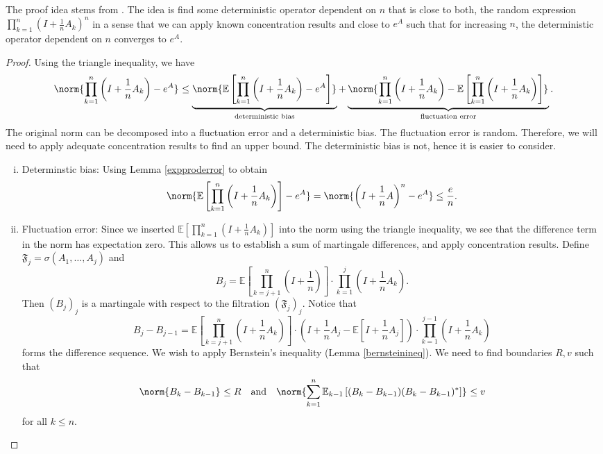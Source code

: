 The proof idea stems from \cite{chen2021product}. The idea is find some deterministic operator dependent on \( n \) that is close to both, the random expression \( \prod_{k=1}^{n}\left(I+\frac{1}{n}A_k\right)^{n} \) in a sense that we can apply known concentration results and close to \( e^{A} \) such that for increasing \( n \), the deterministic operator dependent on \( n \) converges to \( e^{A} \).
\begin{proof}
    Using the triangle inequality, we have 
    \[ \norm{\prod_{k=1}^{n}\left(I+\frac{1}{n}A_k\right)-e^{A}}_{} \leq \underbrace{\norm{\mathbb{E}\left[\prod_{k=1}^{n}\left(I+\frac{1}{n}A_k\right)- e^{A}\right]}_{}}_{\text{deterministic bias}} + \underbrace{\norm{\prod_{k=1}^{n} \left(I+\frac{1}{n}A_k\right)- \mathbb{E}\left[\prod_{k=1}^{n}\left(I+ \frac{1}{n}A_k\right)\right]}_{}}_{\text{fluctuation error}}. \]
    The original norm can be decomposed into a fluctuation error and a deterministic bias. The fluctuation error is random. Therefore, we will need to apply adequate concentration results to find an upper bound. The deterministic bias is not, hence it is easier to consider.
    \begin{enumerate}[(i)]
      \item Determinstic bias:
        Using Lemma \ref{expproderror} to obtain
        \[ \norm{\mathbb{E}\left[\prod_{k=1}^{n}\left(I+\frac{1}{n}A_k\right)\right]-e^{A}} = \norm{\left(I+\frac{1}{n}A\right)^{n} - e^{A}}\leq  \frac{e}{n} .\]
      \item Fluctuation error:
        Since we inserted \( \mathbb{E}\left[\prod_{k=1}^{n}\left(I+\frac{1}{n}A_k\right)\right] \) into the norm using the triangle inequality, we see that the difference term in the norm has expectation zero. This allows us to establish a sum of martingale differences, and apply concentration results. Define \( \mathfrak{F}_j= \sigma(A_1,\dots, A_j) \) and 
        \[ B_j= \mathbb{E}\left[\prod_{k=j+1}^{n}\left(I+\frac{1}{n}\right)\right] \cdot \prod_{k=1}^{j} \left(I+\frac{1}{n}A_k\right).\] 
        Then \( (B_j)_j \) is a martingale with respect to the filtration \( \left(\mathfrak{F}_j\right)_j \). 
        Notice that 
               \[ B_j-B_{j-1} = \mathbb{E}\left[ \prod_{k=j+1}^{n}\left(I+\frac{1}{n}A_k\right)\right] \cdot \left(I+ \frac{1}{n} A_j - \mathbb{E}\left[I+\frac{1}{n}A_j\right]\right) \cdot \prod_{k=1}^{j-1}\left(I+\frac{1}{n}A_k\right)\]
forms the difference sequence. We wish to apply Bernstein's inequality (Lemma \ref{bernsteinineq}). We need to find boundaries \( R, v \) such that \[ \norm{B_k-B_{k-1}}_{} \leq R \quad \text{and} \quad \norm{\sum_{k=1}^{n} \mathbb{E}_{k-1}\left[(B_{k}-B_{k-1})(B_k-B_{k-1})^{*}\right]}_{} \leq v \] for all \( k \leq n\). 

\end{enumerate}
\end{proof}
